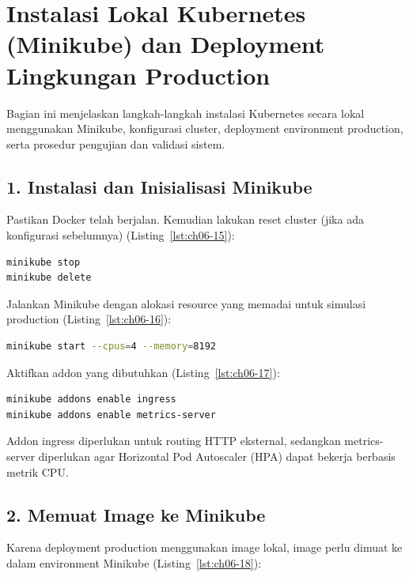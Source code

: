 \section[Instalasi Lokal Kubernetes]{Instalasi Lokal Kubernetes (Minikube) dan Deployment Lingkungan Production}

Bagian ini menjelaskan langkah-langkah instalasi Kubernetes secara lokal menggunakan Minikube, konfigurasi cluster, deployment environment production, serta prosedur pengujian dan validasi sistem.

\subsection*{1. Instalasi dan Inisialisasi Minikube}

Pastikan Docker telah berjalan. Kemudian lakukan reset cluster (jika ada konfigurasi sebelumnya) (Listing~\ref{lst:ch06-15}):

\begin{lstlisting}[language=bash, caption={Mengelola klaster Minikube (2)}, label={lst:ch06-15}]
minikube stop
minikube delete
\end{lstlisting}

Jalankan Minikube dengan alokasi resource yang memadai untuk simulasi production (Listing~\ref{lst:ch06-16}):

\begin{lstlisting}[language=bash, caption={Menjalankan klaster Minikube (2)}, label={lst:ch06-16}]
minikube start --cpus=4 --memory=8192
\end{lstlisting}

Aktifkan addon yang dibutuhkan (Listing~\ref{lst:ch06-17}):

\begin{lstlisting}[language=bash, caption={Perintah minikube addons enable ingress (2)}, label={lst:ch06-17}]
minikube addons enable ingress
minikube addons enable metrics-server
\end{lstlisting}

Addon ingress diperlukan untuk routing HTTP eksternal, sedangkan metrics-server diperlukan agar Horizontal Pod Autoscaler (HPA) dapat bekerja berbasis metrik CPU.

\subsection*{2. Memuat Image ke Minikube}

Karena deployment production menggunakan image lokal, image perlu dimuat ke dalam environment Minikube (Listing~\ref{lst:ch06-18}):

